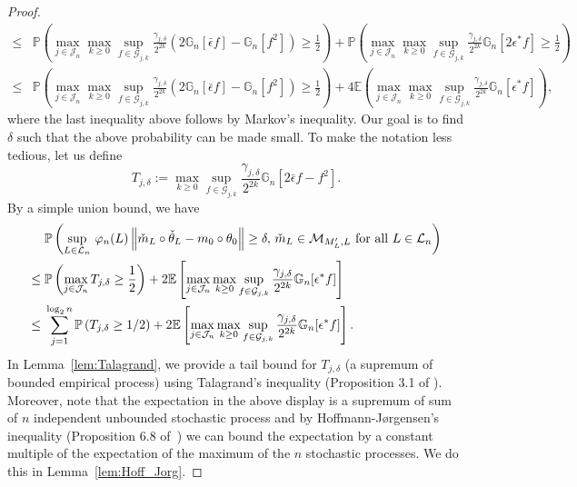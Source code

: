 \begin{proof}
\begin{align*}
\le{}& \mathbb{P}\left(\max_{j\in \mathcal{J}_n}\max_{k \ge 0}\sup_{f\in\mathcal{G}_{j,k}} \frac{\gamma_{j,\delta}}{2^{2k}}\left(2\mathbb{G}_n[\bar\epsilon  f] -\mathbb{G}_n[f^2]\right) \ge \frac{1}{2}\right)+ \mathbb{P}\left(\max_{j\in \mathcal{J}_n}\max_{k \ge 0}\sup_{f\in\mathcal{G}_{j,k}} \frac{\gamma_{j,\delta}}{2^{2k}} \mathbb{G}_n[2\epsilon^* f]\ge \frac{1}{2}\right)\\
\le{}& \mathbb{P}\left(\max_{j\in \mathcal{J}_n}\max_{k \ge 0}\sup_{f\in\mathcal{G}_{j,k}} \frac{\gamma_{j,\delta}}{2^{2k}}\left(2\mathbb{G}_n[\bar\epsilon  f] - \mathbb{G}_n[f^2]\right) \ge \frac{1}{2}\right)+ 4 \mathbb{E}\left(\max_{j\in \mathcal{J}_n}\max_{k \ge 0}\sup_{f\in\mathcal{G}_{j,k}} \frac{\gamma_{j,\delta}}{2^{2k}} \mathbb{G}_n[\epsilon^* f]\right),
\end{align*}
where the last inequality above follows by Markov's inequality. Our goal is to find $\delta$ such that the above probability can be made small. To make the notation less tedious, let us define \begin{equation}\label{eq:T_def}
 T_{j,\delta} := \max_{k \ge 0}\sup_{f\in\mathcal{G}_{j,k}} \frac{\gamma_{j,\delta}}{2^{2k}}\mathbb{G}_n[2\bar\epsilon  f - f^2]. 
\end{equation}
By a simple union bound, we have 
\begin{align}
&\mathbb{P}\left(\sup_{L\in\mathcal{L}_n}\,\varphi_n(L)\left\lVert\check{m}_L\circ\check{\theta}_L - m_0\circ\theta_0\right\rVert \ge \delta,\,\check{m}_L\in\mathcal{M}_{M'_L, L}\mbox{ for all }L \in \mathcal{L}_n\right)\nonumber\\
\le{}&\mathbb{P}\left(\max_{j\in \mathcal{J}_n} T_{j,\delta} \ge \frac{1}{2}\right)+ 2\mathbb{E}\left[\max_{j\in \mathcal{J}_n}\max_{k \ge 0}\sup_{f\in\mathcal{G}_{j,k}} \frac{\gamma_{j,\delta}}{2^{2k}}\mathbb{G}_n[\epsilon^* f]\right]\nonumber\\
\le{}&\sum_{j=1}^{\log_2 n}\mathbb{P}\left( T_{j,\delta} \ge {1}/{2}\right)+ 2\mathbb{E}\left[\max_{j\in \mathcal{J}_n}\max_{k \ge 0}\sup_{f\in\mathcal{G}_{j,k}} \frac{\gamma_{j,\delta}}{2^{2k}}\mathbb{G}_n[\epsilon^* f]\right]\label{eq:Main_proof}.
\end{align}
In Lemma~\ref{lem:Talagrand}, we provide a tail bound for $T_{j,\delta}$ (a supremum of bounded empirical process) using  Talagrand's inequality (Proposition  3.1 of \cite{Gine00}). Moreover, note that the expectation in the above display is a supremum of sum of $n$ independent unbounded stochastic process and by Hoffmann-J{\o}rgensen's inequality (Proposition 6.8 of~\cite{LED91}) we can bound the expectation by a constant multiple of the expectation of the maximum of the $n$ stochastic processes. We do this in Lemma~\ref{lem:Hoff_Jorg}.


\end{proof}
